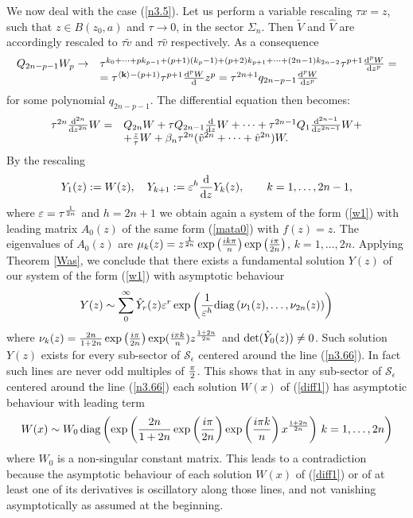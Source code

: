 \documentclass{amsart}
\theoremstyle{definition}
\theoremstyle{remark}
\theoremstyle{remark}
\begin{document}
We now deal with the case (\ref{n3.5}). Let us perform a variable
rescaling $\tau x=z$, such that $z\in B(z_0,a)$ and $\tau\to 0$, in the
sector $\Sigma_n$. Then $\tilde V$ and $\hat V$ are accordingly
rescaled to $\tau\tilde v$ and $\tau\hat v$ respectively.
As a consequence
$$
\begin{array}{ll}
Q_{2n-p-1}W_p\to &
\tau^{k_0+\dots+p k_{p-1}+(p+1)(k_p-1)+(p+2) k_{p+1}+\dots+(2n-1)k_{2n-2}}
\tau^{p+1}{{\rm d}^p W\over{\rm d} z^p}=\\
&=\tau^{\langle{\bf k}\rangle-(p+1)}
\tau^{p+1}{{\rm d}^p W\over{\rm d}} z^p=
\tau^{2n+1} q_{2n-p-1}{{\rm d}^p W\over{\rm d} z^p} \\
\end{array}
$$
for some polynomial $q_{2n-p-1}$. The differential
equation then becomes:
\begin{equation}
\begin{array}{ll}
\tau^{2 n} {{\rm d}^{2n}\over{\rm d} z^{2n}}W= &
Q_{2n} W + \tau Q_{2n-1}{{\rm d}\over{\rm d} z} W + \dots +
\tau^{2n-1}Q_{1} {{\rm d}^{2n-1}\over{\rm d} z^{2n-1}}W
+\\ & + {z\over\tau} W +
\beta_n \tau^{2n}({\tilde v}^{2n}+\dots+{\hat v}^{2n})W.\\
\end{array}\end{equation}
By the rescaling
$$
Y_1(z):=W(z),\quad Y_{k+1}:=\varepsilon^h {{\rm d}\over{\rm d} z}Y_k(z),
\qquad k=1,\dots,2n-1,
$$
where $\varepsilon=\tau^{1\over 2 n}$ and $h=2n+1$ we obtain again a system of the
form (\ref{w1}) with leading matrix $A_0(z)$ of the same form (\ref{mata0})
with $f(z)=z$. The eigenvalues of $A_0(z)$ are
$\mu_k(z)=z^{1\over 2n}\exp\left({i k\pi\over n}\right)
\exp\left({i\pi\over2n}\right)$, $k=1,\dots,2 n$. Applying Theorem
\ref{Was}, we conclude that there exists a fundamental solution
$Y(z)$ of our system
of the form (\ref{w1}) with asymptotic behaviour
$$
Y(z)\sim \sum_0^\infty\hat Y_r(z)\varepsilon^r
\exp\left(
{1\over\varepsilon^h}{\rm diag}\left(\nu_1(z),\dots,\nu_{2n}(z)\right)
\right)
$$
where $\nu_k(z)={2n\over 1+2n}\exp\left({i\pi\over2n}\right)
\exp({i\pi k\over n})z^{1+2n\over 2n}$ and ${\rm det}(\hat Y_0(z))\neq 0$.
Such solution $Y(z)$ exists for every sub-sector of
${\mathcal S}_\epsilon$ centered around the line (\ref{n3.66}).
In fact such lines are never odd multiples of
${\pi\over2}$.  This shows that in any sub-sector of
${\mathcal S}_\epsilon$ centered around the line (\ref{n3.66})
each solution $W(x)$ of (\ref{diff1}) has asymptotic
behaviour with leading term
$$
W(x)\sim {W}_0\,{\rm diag}\left(
\exp\left({2n\over 1+2n}\exp\left({i\pi\over2n}\right)
\exp\left({i\pi k\over n}\right)x^{1+2n\over 2n}\right)
\, k=1,\dots, 2n\right)
$$
where ${W}_0$ is a non-singular constant matrix.
This leads to a contradiction because the asymptotic behaviour of
each solution $W(x)$ of (\ref{diff1}) or of at least one of its
derivatives is oscillatory along those lines, and not vanishing
asymptotically
as assumed at the beginning.
\end{document}
